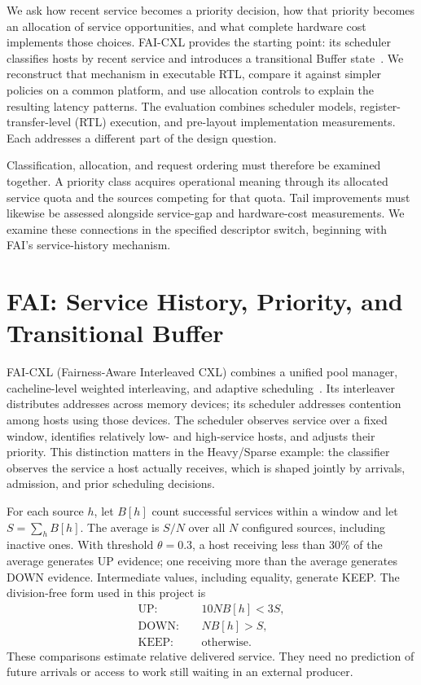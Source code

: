 We ask how recent service becomes a priority decision, how that priority becomes an allocation of service opportunities, and what complete hardware cost implements those choices. FAI-CXL provides the starting point: its scheduler classifies hosts by recent service and introduces a transitional Buffer state~\cite{fai}. We reconstruct that mechanism in executable RTL, compare it against simpler policies on a common platform, and use allocation controls to explain the resulting latency patterns. The evaluation combines scheduler models, register-transfer-level (RTL) execution, and pre-layout implementation measurements. Each addresses a different part of the design question.

Classification, allocation, and request ordering must therefore be examined together. A priority class acquires operational meaning through its allocated service quota and the sources competing for that quota. Tail improvements must likewise be assessed alongside service-gap and hardware-cost measurements. We examine these connections in the specified descriptor switch, beginning with FAI's service-history mechanism.

\section{FAI: Service History, Priority, and Transitional Buffer}
\label{sec:fai}
FAI-CXL (Fairness-Aware Interleaved CXL) combines a unified pool manager, cacheline-level weighted interleaving, and adaptive scheduling~\cite{fai}. Its interleaver distributes addresses across memory devices; its scheduler addresses contention among hosts using those devices. The scheduler observes service over a fixed window, identifies relatively low- and high-service hosts, and adjusts their priority. This distinction matters in the Heavy/Sparse example: the classifier observes the service a host actually receives, which is shaped jointly by arrivals, admission, and prior scheduling decisions.

For each source $h$, let $B[h]$ count successful services within a window and let $S=\sum_h B[h]$. The average is $S/N$ over all $N$ configured sources, including inactive ones. With threshold $\theta=0.3$, a host receiving less than 30\% of the average generates UP evidence; one receiving more than the average generates DOWN evidence. Intermediate values, including equality, generate KEEP. The division-free form used in this project is
\begin{align}
\mathrm{UP}:&\quad 10NB[h]<3S,\nonumber\\
\mathrm{DOWN}:&\quad NB[h]>S,\label{eq:class-v3}\\
\mathrm{KEEP}:&\quad\text{otherwise}.\nonumber
\end{align}
These comparisons estimate relative delivered service. They need no prediction of future arrivals or access to work still waiting in an external producer.

